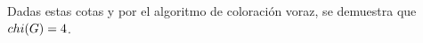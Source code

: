 \documentclass[preview]{standalone}
\begin{document}
\begin{center}
Dadas estas cotas y por el algoritmo de coloración voraz, se demuestra que $\\chi(G) = 4$.
\end{center}
\end{document}
